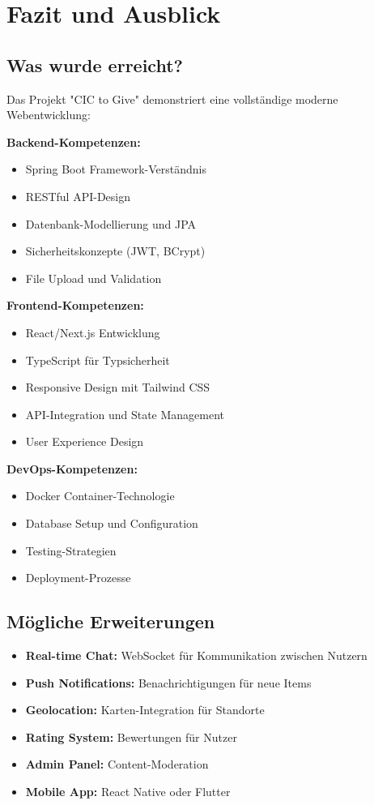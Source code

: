\documentclass[a4paper,12pt]{article}
\begin{document}
\section{Fazit und Ausblick}

\subsection{Was wurde erreicht?}

Das Projekt "CIC to Give" demonstriert eine vollständige moderne Webentwicklung:

\textbf{Backend-Kompetenzen:}
\begin{itemize}
    \item Spring Boot Framework-Verständnis
    \item RESTful API-Design
    \item Datenbank-Modellierung und JPA
    \item Sicherheitskonzepte (JWT, BCrypt)
    \item File Upload und Validation
\end{itemize}

\textbf{Frontend-Kompetenzen:}
\begin{itemize}
    \item React/Next.js Entwicklung
    \item TypeScript für Typsicherheit
    \item Responsive Design mit Tailwind CSS
    \item API-Integration und State Management
    \item User Experience Design
\end{itemize}

\textbf{DevOps-Kompetenzen:}
\begin{itemize}
    \item Docker Container-Technologie
    \item Database Setup und Configuration
    \item Testing-Strategien
    \item Deployment-Prozesse
\end{itemize}

\subsection{M{\"o}gliche Erweiterungen}

\begin{itemize}
    \item \textbf{Real-time Chat:} WebSocket f{\"u}r Kommunikation zwischen Nutzern
    \item \textbf{Push Notifications:} Benachrichtigungen f{\"u}r neue Items
    \item \textbf{Geolocation:} Karten-Integration für Standorte
    \item \textbf{Rating System:} Bewertungen f{\"u}r Nutzer
    \item \textbf{Admin Panel:} Content-Moderation
    \item \textbf{Mobile App:} React Native oder Flutter
\end{itemize}
\end{document}
